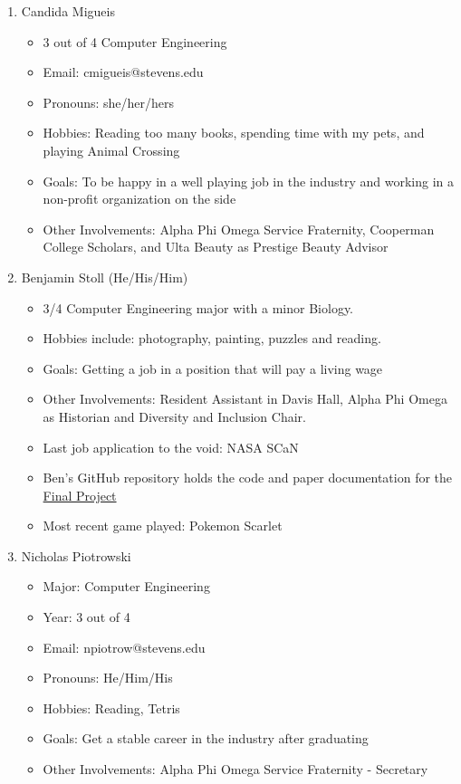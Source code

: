 \begin{enumerate}
    \item Candida Migueis
        \begin{itemize}
            \item 3 out of 4 Computer Engineering
            \item Email: cmigueis@stevens.edu
            \item Pronouns: she/her/hers
            \item Hobbies: Reading too many books, spending time with my pets, and playing Animal Crossing
            \item Goals: To be happy in a well playing job in the industry and working in a non-profit organization on the side
            \item Other Involvements: Alpha Phi Omega Service Fraternity, Cooperman College Scholars, and Ulta Beauty as Prestige Beauty Advisor
        \end{itemize}
    \item Benjamin Stoll (He/His/Him)
        \begin{itemize}
            \item 3/4 Computer Engineering major with a minor Biology. 
            \item Hobbies include: photography, painting, puzzles and reading.
            \item Goals: Getting a job in a position that will pay a living wage
            \item Other Involvements: Resident Assistant in Davis Hall, Alpha Phi Omega as Historian and Diversity and Inclusion Chair.
            \item Last job application to the void: NASA SCaN
            \item Ben's GitHub repository holds the code and paper documentation for the \href{https://github.com/BenStoll/CPE487/blob/main/FinalProject/manIntroduction.tex}{Final Project}
            \item Most recent game played: Pokemon Scarlet
        \end{itemize}
    \item Nicholas Piotrowski
        \begin{itemize}
            \item Major: Computer Engineering
            \item Year: 3 out of 4
            \item Email: npiotrow@stevens.edu
            \item Pronouns: He/Him/His
            \item Hobbies: Reading, Tetris
            \item Goals: Get a stable career in the industry after graduating
            \item Other Involvements: Alpha Phi Omega Service Fraternity - Secretary
        \end{itemize}
\end{enumerate}
